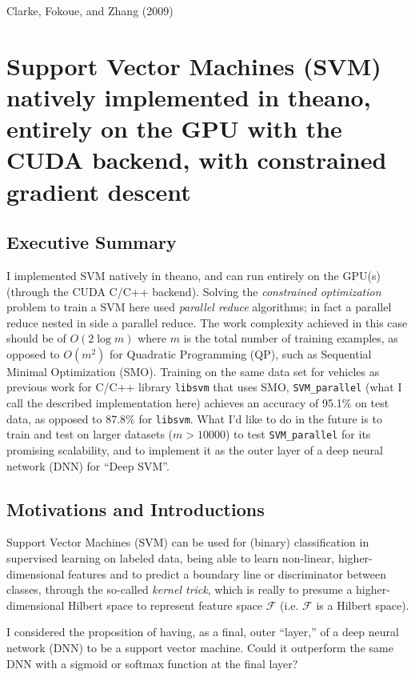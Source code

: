 \documentclass[10pt]{amsart}
\begin{document}
\begin{multicols*}{2}
Clarke, Fokoue, and Zhang (2009) \cite{CFZ2009}



\section{Support Vector Machines (SVM) natively implemented in theano, entirely on the GPU with the CUDA backend, with constrained gradient descent}

\subsection{Executive Summary}

I implemented SVM natively in theano, and can run entirely on the GPU(s) (through the CUDA C/C++ backend).  Solving the \emph{constrained optimization} problem to train a SVM here used \emph{parallel reduce} algorithms; in fact a parallel reduce nested in side a parallel reduce.  The work complexity achieved in this case should be of $O(2\log{m})$ where $m$ is the total number of training examples, as opposed to $O(m^2)$ for Quadratic Programming (QP), such as Sequential Minimal Optimization (SMO).  Training on the same data set for vehicles as previous work for C/C++ library \verb|libsvm| that uses SMO, \verb|SVM_parallel| (what I call the described implementation here) achieves an accuracy of 95.1\% on test data, as opposed to 87.8\% for \verb|libsvm|.  What I'd like to do in the future is to train and test on larger datasets ($m>10000$) to test \verb|SVM_parallel| for its promising scalability, and to implement it as the outer layer of a deep neural network (DNN) for ``Deep SVM''.  

\subsection{Motivations and Introductions}\label{Sec:MotivationsIntroductions}

Support Vector Machines (SVM) can be used for (binary) classification in supervised learning on labeled data, being able to learn non-linear, higher-dimensional features and to predict a boundary line or discriminator between classes, through the so-called \emph{kernel trick}, which is really to presume a higher-dimensional Hilbert space to represent feature space $\mathcal{F}$ (i.e. $\mathcal{F}$ is a Hilbert space).

I considered the proposition of having, as a final, outer ``layer,'' of a deep neural network (DNN) to be a support vector machine.  Could it outperform the same DNN with a sigmoid or softmax function at the final layer?


\end{multicols*}
\end{document}
